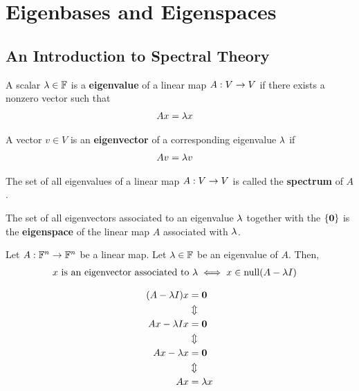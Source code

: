 \section{Eigenbases and Eigenspaces}

\subsection{An Introduction to Spectral Theory}

\begin{definition}
    A scalar $\lambda \in \mathbb{F}$ is a \textbf{eigenvalue} of a linear map $A: V \rightarrow V$ if there exists a nonzero vector such that 
    \begin{align*}
        Ax &= \lambda x
    \end{align*} 
\end{definition}

\begin{definition}
    A vector $v \in V$ is an \textbf{eigenvector} of a corresponding eigenvalue $\lambda$ if
    \begin{align*}
        Av &= \lambda v
    \end{align*} 
\end{definition}

\begin{definition}
    The set of all eigenvalues of a linear map $A: V \rightarrow V$ is called the \textbf{spectrum} of $A$.
\end{definition}

\begin{definition}
    The set of all eigenvectors associated to an eigenvalue $\lambda$ together with the $\{ \mathbf{0} \}$ is the \textbf{eigenspace} of the linear map $A$
    associated with $\lambda$.
\end{definition}

\begin{lemma}
    Let $A : \mathbb{F}^n \rightarrow \mathbb{F}^n$ be a linear map. Let $ \lambda \in \mathbb{F}$ be an eigenvalue of $A$. Then,
    \begin{align*}
        \text{$x$ is an eigenvector associated to $\lambda$} &\iff x \in \text{null}(A - \lambda I)
    \end{align*}
\end{lemma}

\begin{corollary}
    \begin{align*}
        (A - \lambda I)x &= \mathbf{0} \\
        & \Updownarrow  \\
        Ax - \lambda I x &= \mathbf{0} \\
        & \Updownarrow  \\
        Ax - \lambda x &= \mathbf{0} \\
        & \Updownarrow  \\
        Ax &= \lambda x
    \end{align*}
\end{corollary}

